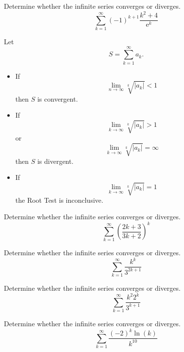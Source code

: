 \documentclass[compacto,10pt,comentarios]{aleph-notas}
\begin{document}
\begin{ejer}
    Determine whether the infinite series converges or diverges.
    $$
        \sum_{k=1}^{\infty} (-1)^{k+1} \frac{k^2+4}{\mathrm{e}^{k}}
    $$
\end{ejer}

\begin{defi}
    Let 
    $$
        S = \sum_{k=1}^{\infty} a_k.
    $$
    \begin{itemize}
        \item If 
        $$
            \lim_{n\to\infty}\sqrt[k]{|a_k|} < 1
        $$ then $S$ is convergent.
        \item If
        $$
            \lim_{k \to \infty} \sqrt[k]{|a_k|} > 1
        $$ 
        or 
        $$
            \lim_{k \to \infty} \sqrt[k]{|a_k|}=\infty
        $$
        then $S$ is divergent.
        \item
        If 
            $$
                \lim_{k \to \infty} \sqrt[k]{|a_k|}=1
            $$
        the Root Test is inconclusive. 
\end{itemize}
\end{defi}


\begin{ejer}
    Determine whether the infinite series converges or diverges.
    $$
        \sum_{k=1}^{\infty} \left( \frac{2k + 3}{3 k + 2} \right) ^ {k}
    $$
\end{ejer}

\begin{ejer}
    Determine whether the infinite series converges or diverges.
    $$
        \sum_{k=1}^{\infty} \frac{k ^ {k}}{3 ^ {2k + 1}}
    $$
\end{ejer}

\begin{ejer}
    Determine whether the infinite series converges or diverges.
    $$
        \sum_{k=1}^\infty \frac{k ^ {2} 2 ^ {k}}{3 ^ {k + 1}}
    $$
\end{ejer}

\begin{ejer}
    Determine whether the infinite series converges or diverges.
    $$
        \sum_{k=1}^{\infty} \frac{(-2)^{k} \ln(k)}{k ^ {10}}
    $$
\end{ejer}
\end{document}
